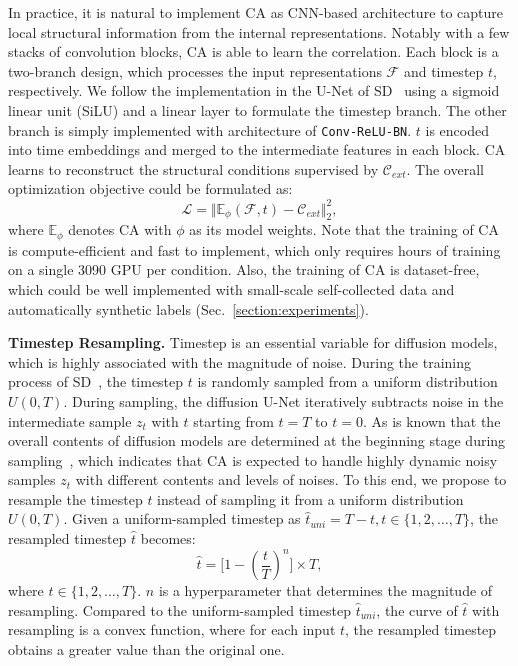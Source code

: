 \documentclass{article}
\begin{document}
In practice, it is natural to implement CA as CNN-based architecture to capture local structural information from the internal representations. Notably with a few stacks of convolution blocks, CA is able to learn the correlation. Each block is a two-branch design, which processes the input representations $\mathcal{F}$ and timestep $t$, respectively. We follow the implementation in the U-Net of SD~\cite{nichol2021improved} using a sigmoid linear unit (SiLU) and a linear layer to formulate the timestep branch. The other branch is simply implemented with architecture of \texttt{Conv-ReLU-BN}. $t$ is encoded into time embeddings and merged to the intermediate features in each block. CA learns to reconstruct the structural conditions supervised by $\mathcal{C}_{ext}$. The overall optimization objective could be formulated as:
\begin{equation}
\mathcal{L} = \Vert \mathbb{E}_\phi(\mathcal{F}, t) - \mathcal{C}_{ext} \Vert^2_2,
\end{equation}
where $\mathbb{E}_\phi$ denotes CA with $\phi$ as its model weights. Note that the training of CA is compute-efficient and fast to implement, which only requires hours of training on a single 3090 GPU per condition. Also, the training of CA is dataset-free, which could be well implemented with small-scale self-collected data and automatically synthetic labels (Sec.~\ref{section:experiments}).


\textbf{Timestep Resampling.} Timestep is an essential variable for diffusion models, which is highly associated with the magnitude of noise. During the training process of SD~\cite{rombach2022high}, the timestep $t$ is randomly sampled from a uniform distribution $U(0, T)$. During sampling, the diffusion U-Net iteratively subtracts noise in the intermediate sample $z_t$ with $t$ starting from $t=T$ to $t=0$. As is known that the overall contents of diffusion models are determined at the beginning stage during sampling~\cite{mou2023t2i}, which indicates that CA is expected to handle highly dynamic noisy samples $z_t$ with different contents and levels of noises. To this end, we propose to resample the timestep $t$ instead of sampling it from a uniform distribution $U(0, T)$. Given a uniform-sampled timestep as $\hat{t}_{uni} = T - t, t \in \{1, 2, \dots, T\}$, the resampled timestep $\hat{t}$ becomes:
\begin{equation}
\hat{t} = \big[ 1 - (\frac{t}{T})^n \big] \times T,
\end{equation}
where $t \in \{1, 2, \dots, T\}$. $n$ is a hyperparameter that determines the magnitude of resampling. Compared to the uniform-sampled timestep $\hat{t}_{uni}$, the curve of $\hat{t}$ with resampling is a convex function, where for each input $t$, the resampled timestep obtains a greater value than the original one.
\end{document}
